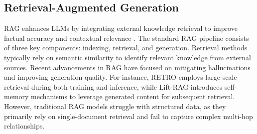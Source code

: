 \documentclass[11pt]{article}
\begin{document}
\subsection{Retrieval-Augmented Generation}
RAG enhances LLMs by integrating external knowledge retrieval to improve factual accuracy and contextual relevance \cite{gao2023retrieval, fan2024survey}. The standard RAG pipeline \cite{lewis2020retrieval} consists of three key components: indexing, retrieval, and generation. Retrieval methods typically rely on semantic similarity \cite{khattab2020colbert} to identify relevant knowledge from external sources. Recent advancements in RAG have focused on mitigating hallucinations and improving generation quality. For instance, RETRO \cite{borgeaud2022improving} employs large-scale retrieval during both training and inference, while Lift-RAG \cite{cheng2024lift} introduces self-memory mechanisms to leverage generated content for subsequent retrieval. However, traditional RAG models struggle with structured data, as they primarily rely on single-document retrieval and fail to capture complex multi-hop relationships.
\end{document}
